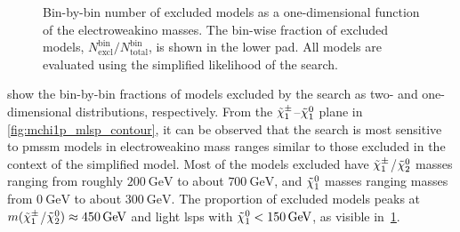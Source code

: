 \begin{figure}
\begin{subfigure}[b]{0.5\linewidth}
	\end{subfigure}\hfill
	\caption{Bin-by-bin number of excluded models as a one-dimensional function of the electroweakino masses. The bin-wise fraction of excluded models, $N^\mathrm{bin}_\mathrm{excl} / N^\mathrm{bin}_\mathrm{total}$, is shown in the lower pad. All models are evaluated using the simplified likelihood of the \onelepton search.}
	\label{fig:impact_electroweakinos_1D}
\end{figure}

 show the bin-by-bin fractions of models excluded by the \onelepton search as two- and one-dimensional distributions, respectively. From the $\tilde{\chi}_1^\pm$--$\tilde{\chi}_1^0$ plane in \cref{fig:mchi1p_mlsp_contour}, it can be observed that the \onelepton search is most sensitive to \gls{pmssm} models in electroweakino mass ranges similar to those excluded in the context of the simplified model. Most of the models excluded have $\tilde{\chi}_1^\pm$/$\tilde{\chi}_2^0$ masses ranging from roughly $\SI{200}{\GeV}$ to about $\SI{700}{\GeV}$, and $\tilde{\chi}_1^0$ masses ranging masses from $\SI{0}{\GeV}$ to about $\SI{300}{\GeV}$. The proportion of excluded models peaks at \mbox{$m(\tilde{\chi}_1^\pm$/$\neutr) \approx \SI{450}{\GeV}$} and light \glspl{lsp} with $\lsp < \SI{150}{\GeV}$, as visible in~\cref{fig:impact_electroweakinos_1D}. 


